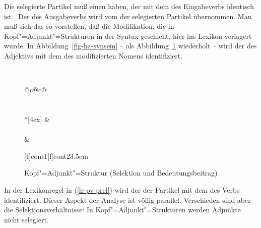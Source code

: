 Die selegierte Partikel muß einen \modw haben, der mit dem \synsemw des Eingabeverbs
identisch ist . Der \contw des Ausgabeverbs wird vom \contw der selegierten
Partikel  übernommen. Man muß sich das so vorstellen, daß die Modifikation,
die in Kopf"=Adjunkt"=Strukturen in der Syntax geschieht, hier ins Lexikon verlagert wurde.
In Abbildung~\vref{fig-ha-synsem} --  als Abbildung~\ref{fig-ha-synsem-zwei} wiederholt --
wird der \modw des Adjektivs mit dem \synsemw des modifizierten Nomens identifiziert. 
\begin{figure}[htbp]
~~~~\begin{tabular}[t]{@{}c@{\hspace{3mm}}c@{}}
\\[4ex]
\\
\\*[4ex]
 & \\
\\[4ex]
                     & \\
\end{tabular}
 
 
\ncline{<->}[t]{cont1}[l]{cont2}{3.5cm}
\caption{\label{fig-ha-synsem-zwei}Kopf"=Adjunkt"=Struktur (Selektion und Bedeutungsbeitrag)}
\end{figure}
In der Lexikonregel in (\ref{lr-pv-prel}) wird der \modw der Partikel mit dem
\synsemw des Verbs identifiziert. Dieser Aspekt der Analyse ist völlig parallel. Verschieden
sind aber die Selektionsverhältnisse: In Kopf"=Adjunkt"=Strukturen werden Adjunkte nicht selegiert.
